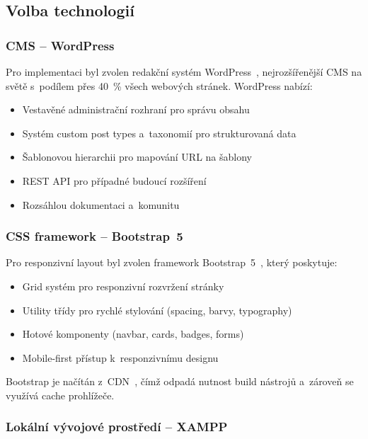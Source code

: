 \documentclass[12pt,a4paper]{article}
\begin{document}
\subsection{Volba technologií}

\subsubsection{CMS -- WordPress}

Pro implementaci byl zvolen redakční systém WordPress~\cite{wordpress}, nejrozšířenější CMS na světě s~podílem přes 40~\% všech webových stránek. WordPress nabízí:

\begin{itemize}
    \item Vestavěné administrační rozhraní pro správu obsahu
    \item Systém custom post types a~taxonomií pro strukturovaná data
    \item Šablonovou hierarchii pro mapování URL na šablony
    \item REST API pro případné budoucí rozšíření
    \item Rozsáhlou dokumentaci a~komunitu~\cite{wpdev}
\end{itemize}

\subsubsection{CSS framework -- Bootstrap~5}

Pro responzivní layout byl zvolen framework Bootstrap~5~\cite{bootstrap}, který poskytuje:

\begin{itemize}
    \item Grid systém pro responzivní rozvržení stránky
    \item Utility třídy pro rychlé stylování (spacing, barvy, typography)
    \item Hotové komponenty (navbar, cards, badges, forms)
    \item Mobile-first přístup k~responzivnímu designu
\end{itemize}

Bootstrap je načítán z~CDN~\cite{jsdelivr}, čímž odpadá nutnost build nástrojů a~zároveň se využívá cache prohlížeče.

\subsubsection{Lokální vývojové prostředí -- XAMPP}
\end{document}
